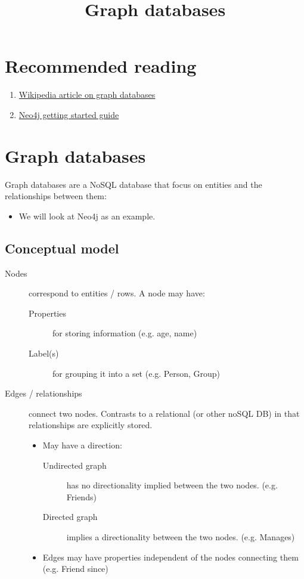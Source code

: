 \documentclass[slides]{pgnotes}
\title{Graph databases}
\begin{document}
\maketitle

\section*{Recommended reading}

\begin{enumerate}
\item \href{https://en.wikipedia.org/wiki/Graph_database}{Wikipedia article on graph databases}
\item \href{https://neo4j.com/docs/getting-started/current/}{Neo4j getting started guide}
\end{enumerate}

\section{Graph databases}

Graph databases are a NoSQL database that focus on entities and the relationships between them:
\begin{itemize}
\item We will look at Neo4j as an example.
\end{itemize}

\subsection{Conceptual model}

\begin{description}
\item[Nodes] correspond to entities / rows.
  A node may have:
  \begin{description}
  \item[Properties] for storing information (e.g. age, name)
  \item[Label(s)] for grouping it into a set (e.g. Person, Group)
  \end{description}
\item[Edges / relationships] connect two nodes. Contrasts to a relational (or other noSQL DB) in that relationships are explicitly stored. 
  \begin{itemize}
  \item May have a direction:
    \begin{description}
    \item[Undirected graph] has no directionality implied between the two nodes. (e.g. Friends)
    \item[Directed graph] implies a directionality between the two nodes. (e.g. Manages)
    \end{description}
  \item Edges may have properties independent of the nodes connecting them (e.g. Friend since)
  \end{itemize}
\end{description}
\end{document}
